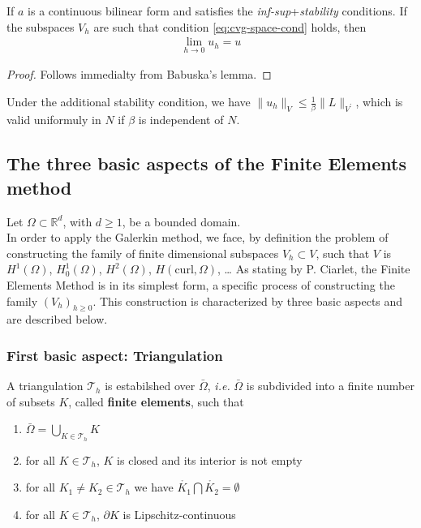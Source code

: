 \begin{theorem}
  If $a$ is a continuous bilinear form and satisfies the \textit{inf-sup}+\textit{stability} conditions. If the subspaces $V_h$ are such that condition \eqref{eq:cvg-space-cond} holds, then 
  \begin{align*}
    \lim\limits_{h \rightarrow 0} u_h = u 
  \end{align*}
\end{theorem}
\begin{proof}
  Follows immedialty from Babuska's lemma.
\end{proof}
\begin{remark}
  Under the additional stability condition, we have $\| u_h \|_V \leq \frac{1}{\beta} \| L \|_{V^\prime}$, which is valid uniformuly in $N$ if $\beta$ is independent of $N$.
\end{remark}

\subsection{The three basic aspects of the Finite Elements method}
Let $\Omega \subset \mathbb{R}^d$, with $d \geq 1$, be a bounded domain.
\\
In order to apply the Galerkin method, we face, by definition the problem of constructing the family of finite dimensional subspaces $V_h \subset V$, such that $V$ is $H^1(\Omega)$, $H^1_0(\Omega)$, $H^2(\Omega)$, $H(\mbox{curl}, \Omega)$, \ldots
As stating by P. Ciarlet, the Finite Elements Method is in its simplest form, a specific process of constructing the family $\left( V_h \right)_{h \geq 0}$. This construction is characterized by three basic aspects and are described below.
\subsubsection*{First basic aspect: Triangulation}
A triangulation $\mathcal{T}_h$ is estabilshed over $\bar{\Omega}$, \textit{i.e.} $\bar{\Omega}$ is subdivided into a finite number of subsets $K$, called \textbf{finite elements},  such that
\begin{enumerate}
  \item  $\bar{\Omega} = \bigcup\limits_{K \in \mathcal{T}_h} K$ 
  \item  for all $K \in \mathcal{T}_h$, $K$ is closed and its interior is not empty 
  \item  for all $K_1 \neq K_2 \in \mathcal{T}_h$ we have $\mathring{K_1} \bigcap \mathring{K_2} = \emptyset$
  \item  for all $K \in \mathcal{T}_h$, $\partial K$ is Lipschitz-continuous  
\end{enumerate}
